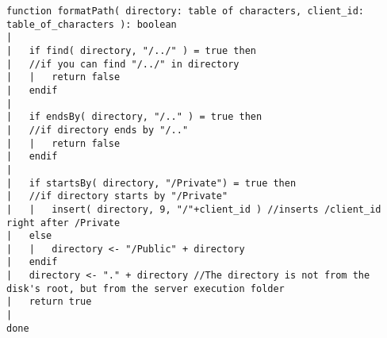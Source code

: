 \begin{lstlisting}
function formatPath( directory: table of characters, client_id: table_of_characters ): boolean
|
|	if find( directory, "/../" ) = true then
|	//if you can find "/../" in directory
|	|	return false
|	endif
|
|	if endsBy( directory, "/.." ) = true then
|	//if directory ends by "/.."
|	|	return false
|	endif
|
|	if startsBy( directory, "/Private") = true then
|	//if directory starts by "/Private"
|	|	insert( directory, 9, "/"+client_id ) //inserts /client_id right after /Private
|	else
|	|	directory <- "/Public" + directory
|	endif
|	directory <- "." + directory //The directory is not from the disk's root, but from the server execution folder
|	return true
|
done
\end{lstlisting}